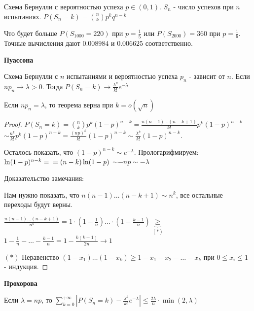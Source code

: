 \begin{definition}
    Схема Бернулли с вероятностью успеха $p \in (0, 1)$. $S_n$ - число успехов при $n$ испытаниях. $P(S_n = k) = \binom{n}{k} p^k q^{n - k}$

    Что будет больше $P(S_{1000} = 220)$ при $p = \frac{1}{5}$ или $P(S_{2000}) = 360$ при $p = \frac{1}{6}$. Точные вычисления дают $0.008984$ и
    $0.006625$ соответственно.

\end{definition}

\begin{theorem}
    \textbf{Пуассона}

    Схема Бернулли с $n$ испытаниями и вероятностью успеха $p_n$ - зависит от $n$.
    Если $np_n \rightarrow \lambda > 0$. Тогда $P(S_n = k) \rightarrow \frac{\lambda^k}{k!} e^{-\lambda}$
\end{theorem}

\begin{remark}
    Если $n p_n = \lambda$, то теорема верна при $k = o(\sqrt{n})$
\end{remark}

\begin{proof}
    $P(S_n = k) = \binom{n}{k} p^k (1 - p)^{n - k} = \frac{n(n - 1)\ldots(n - k + 1)}{k!} p^k (1 - p)^{n - k}$
    $\sim \frac{n^k}{k!} p^k (1 - p)^{n - k} = \frac{(np)^k}{k!} (1 - p)^{n - k} \sim \frac{\lambda^k}{k!} (1 - p)^{n - k}$.

    Осталось показать, что $(1 - p)^{n - k} \sim e^{-\lambda}$. Прологарифмируем: $\ln (1 - p)^{n - k} = \\ = (n - k) \ln (1 - p)$
    $\sim -n p \sim -\lambda$

    Доказательство замечания:

    Нам нужно показать, что $n(n - 1)\ldots(n - k + 1) \sim n^k$, все остальные переходы будут верны.

    $\frac{n(n - 1) \ldots (n - k + 1)}{n^k} = 1 \cdot (1 - \frac{1}{n}) \ldots \cdot (1 - \frac{k - 1}{n}) \underbrace{\geqslant}_{(*)}$
    $1 - \frac{1}{n} - \ldots -  \frac{k - 1}{n} = 1 - \frac{k(k - 1)}{2n} \rightarrow 1$

    $(*)$ Неравенство $(1 - x_1) \ldots (1 - x_k) \geqslant 1 - x_1 - x_2 - \ldots - x_k$ при $0 \leqslant x_i \leqslant 1$ - индукция.
\end{proof}

\begin{theorem}
    \textbf{Прохорова}

    Если $\lambda = np$, то $\sum_{k = 0}^{+\infty} |P(S_n = k) - \frac{\lambda^k}{k!}e^{-\lambda}| \leqslant \frac{2\lambda}{n} \cdot \min(2, \lambda)$

\end{theorem}

